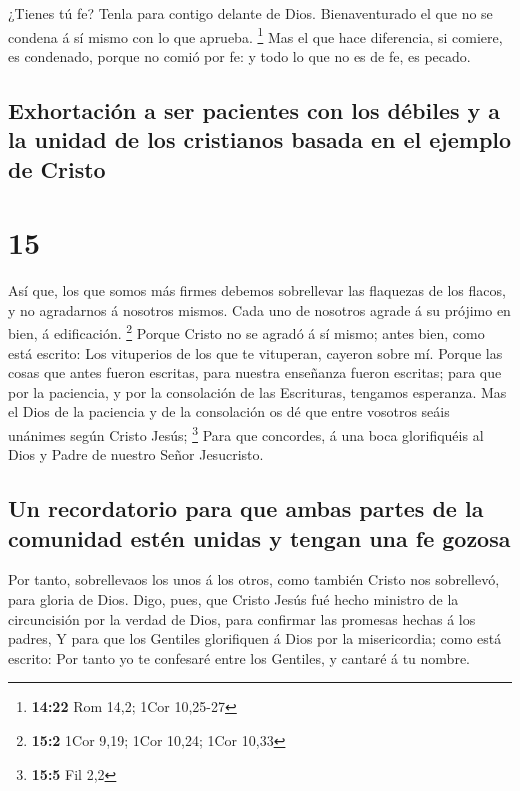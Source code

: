  ¿Tienes tú fe? Tenla para contigo delante de Dios.
Bienaventurado el que no se condena á sí mismo con lo que aprueba.
\footnote{\textbf{14:22} Rom 14,2; 1Cor 10,25-27}  Mas el
que hace diferencia, si comiere, es condenado, porque no comió por fe: y
todo lo que no es de fe, es pecado.

\hypertarget{exhortaciuxf3n-a-ser-pacientes-con-los-duxe9biles-y-a-la-unidad-de-los-cristianos-basada-en-el-ejemplo-de-cristo}{%
\subsection{Exhortación a ser pacientes con los débiles y a la unidad de
los cristianos basada en el ejemplo de
Cristo}\label{exhortaciuxf3n-a-ser-pacientes-con-los-duxe9biles-y-a-la-unidad-de-los-cristianos-basada-en-el-ejemplo-de-cristo}}

\hypertarget{section-14}{%
\section{15}\label{section-14}}

 Así que, los que somos más firmes debemos sobrellevar las
flaquezas de los flacos, y no agradarnos á nosotros mismos. 
Cada uno de nosotros agrade á su prójimo en bien, á edificación.
\footnote{\textbf{15:2} 1Cor 9,19; 1Cor 10,24; 1Cor 10,33} 
Porque Cristo no se agradó á sí mismo; antes bien, como está escrito:
Los vituperios de los que te vituperan, cayeron sobre mí. 
Porque las cosas que antes fueron escritas, para nuestra enseñanza
fueron escritas; para que por la paciencia, y por la consolación de las
Escrituras, tengamos esperanza.  Mas el Dios de la paciencia
y de la consolación os dé que entre vosotros seáis unánimes según Cristo
Jesús; \footnote{\textbf{15:5} Fil 2,2}  Para que concordes,
á una boca glorifiquéis al Dios y Padre de nuestro Señor Jesucristo.

\hypertarget{un-recordatorio-para-que-ambas-partes-de-la-comunidad-estuxe9n-unidas-y-tengan-una-fe-gozosa}{%
\subsection{Un recordatorio para que ambas partes de la comunidad estén
unidas y tengan una fe
gozosa}\label{un-recordatorio-para-que-ambas-partes-de-la-comunidad-estuxe9n-unidas-y-tengan-una-fe-gozosa}}

 Por tanto, sobrellevaos los unos á los otros, como también
Cristo nos sobrellevó, para gloria de Dios.  Digo, pues, que
Cristo Jesús fué hecho ministro de la circuncisión por la verdad de
Dios, para confirmar las promesas hechas á los padres,  Y
para que los Gentiles glorifiquen á Dios por la misericordia; como está
escrito: Por tanto yo te confesaré entre los Gentiles, y cantaré á tu
nombre.

